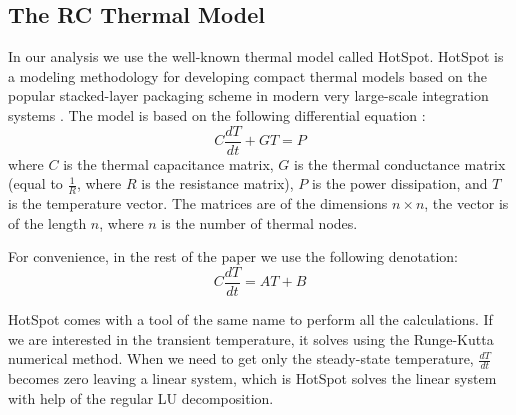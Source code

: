 \subsection{The RC Thermal Model}
In our analysis we use the well-known thermal model called HotSpot. HotSpot is a modeling methodology for developing compact thermal models based on the popular stacked-layer packaging scheme in modern very large-scale integration systems \cite{huang2006}. The model is based on the following differential equation \cite{rao2008}:
\[
  C \frac{dT}{dt} + G T = P
\]
where $C$ is the thermal capacitance matrix, $G$ is the thermal conductance matrix (equal to $\frac{1}{R}$, where $R$ is the resistance matrix), $P$ is the power dissipation, and $T$ is the temperature vector. The matrices are of the dimensions $n \times n$, the vector is of the length $n$, where $n$ is the number of thermal nodes.

For convenience, in the rest of the paper we use the following denotation:
\begin{equation} \label{eq:initial}
  C \frac{dT}{dt} = A T + B
\end{equation}

HotSpot comes with a tool of the same name to perform all the calculations. If we are interested in the transient temperature, it solves  using the Runge-Kutta numerical method. When we need to get only the steady-state temperature, $\frac{dT}{dt}$ becomes zero leaving a linear system, which is HotSpot solves the linear system with help of the regular LU decomposition.
